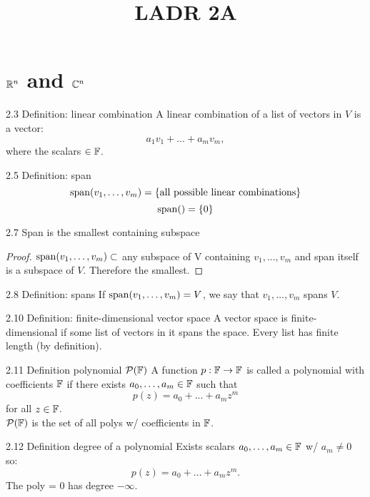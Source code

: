 \documentclass[12pt, letterpaper]{article}
\title{LADR 2A}
\begin{document}
\maketitle

\section*{$\mathbb{R}^n$ and $\mathbb{C}^n$}

\begin{imp}{2.3 Definition: linear combination}
A linear combination of a list of vectors in $V$ is a vector:
$$a_1v_1+\dots+a_mv_m,$$
where the scalars $\in\mathbb{F}$.
\end{imp}

\begin{imp}{2.5 Definition: span}
$$\operatorname{span}(v_1,\dots,v_m)=\{\text{all possible linear combinations}\}$$
$$\operatorname{span}()=\{0\}$$
\end{imp}

\begin{imp}{2.7 Span is the smallest containing subspace}
\begin{proof}
$\operatorname{span}(v_1,\dots,v_m)\subset$ any subspace of V containing $v_1,\dots,v_m$ and span itself is a subspace of $V$. 
Therefore the smallest.
\end{proof}
\end{imp}

\begin{imp}{2.8 Definition: spans}
If $\operatorname{span}(v_1,\dots,v_m)=V$, we say that $v_1,\dots,v_m$ spans $V$.
\end{imp}
\begin{imp}{2.10 Definition: finite-dimensional vector space}
A vector space is finite-dimensional if some list of vectors in it spans the space.
Every list has finite length (by definition).
\end{imp}

\begin{imp}{2.11 Definition polynomial $\mathcal{P}(\mathbb{F})$}
A function $p:\mathbb{F}\to\mathbb{F}$ is called a polynomial with coefficients $\mathbb{F}$ 
if there exists $a_0,\dots,a_m\in\mathbb{F}$ such that
$$p(z)=a_0+...+a_mz^m$$
for all $z\in\mathbb{F}$.
\\$\mathcal{P}(\mathbb{F})$ is the set of all polys w/ coefficients in $\mathbb{F}$.
\end{imp}

\begin{imp}{2.12 Definition degree of a polynomial}
Exists scalars $a_0,\dots,a_m\in\mathbb{F}$ w/ $a_m\neq0$ so:
$$p(z)=a_0+\dots+a_mz^m.$$
The poly = 0 has degree $-\infty$.
\end{imp}
\end{document}
